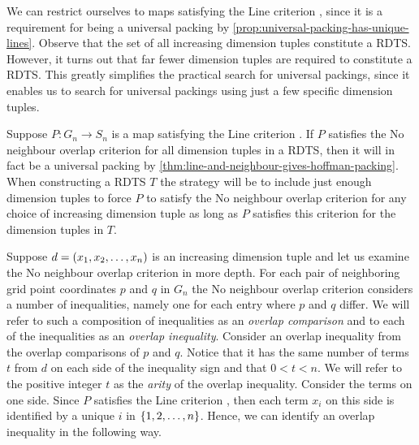 
\noindent We can restrict ourselves to maps satisfying the Line criterion , since it is a requirement for being a universal packing by \cref{prop:universal-packing-has-unique-lines}. Observe that the set of all increasing dimension tuples constitute a RDTS. However, it turns out that far fewer dimension tuples are required to constitute a RDTS. This greatly simplifies the practical search for universal packings, since it enables us to search for universal packings using just a few specific dimension tuples.

Suppose $P\colon G_n \to S_n$ is a map satisfying the Line criterion . If $P$ satisfies the No neighbour overlap criterion  for all dimension tuples in a RDTS, then it will in fact be a universal packing by \cref{thm:line-and-neighbour-gives-hoffman-packing}. When constructing a RDTS $T$ the strategy will be to include just enough dimension tuples to force $P$ to satisfy the No neighbour overlap criterion  for any choice of increasing dimension tuple as long as $P$ satisfies this criterion for the dimension tuples in $T$.

Suppose $d = \left( x_1, x_2, \dotsc, x_n \right)$ is an increasing dimension tuple and let us examine the No neighbour overlap criterion  in more depth. For each pair of neighboring grid point coordinates $p$ and $q$ in $G_n$ the No neighbour overlap criterion  considers a number of inequalities, namely one for each entry where $p$ and $q$ differ. We will refer to such a composition of inequalities as an \textit{overlap comparison} and to each of the inequalities as an \textit{overlap inequality}. Consider an overlap inequality from the overlap comparisons of $p$ and $q$. Notice that it has the same number of terms $t$ from $d$ on each side of the inequality sign and that $0 < t < n$. We will refer to the positive integer $t$ as the \textit{arity} of the overlap inequality. Consider the terms on one side. Since $P$ satisfies the Line criterion , then each term $x_i$ on this side is identified by a unique $i$ in $\left\{ 1, 2, \dotsc, n \right\}$. Hence, we can identify an overlap inequality in the following way.

